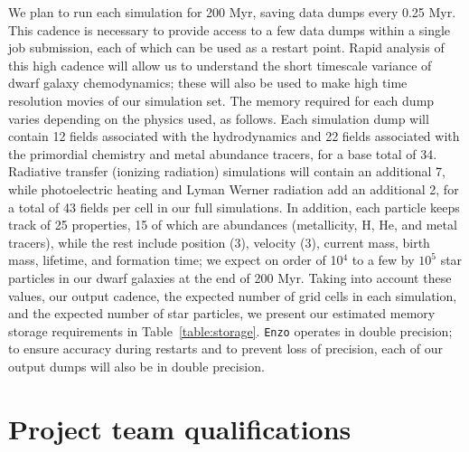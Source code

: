 \documentclass[11pt]{article}
\begin{document}
We plan to run each simulation for 200 Myr, saving data dumps every 0.25 Myr. This cadence is necessary to provide access to a few data dumps within a single job submission, each of which can be used as a restart point. Rapid analysis of this high cadence will allow us to understand the short timescale variance of dwarf galaxy chemodynamics; these will also be used to make high time resolution movies of our simulation set. The memory required for each dump varies depending on the physics used, as follows. Each simulation dump will contain 12 fields associated with the hydrodynamics and 22 fields associated with the primordial chemistry and metal abundance tracers, for a base total of 34. Radiative transfer (ionizing radiation) simulations will contain an additional 7, while photoelectric heating and Lyman Werner radiation add an additional 2, for a total of 43 fields per cell in our full simulations. In addition, each particle keeps track of 25 properties, 15 of which are abundances (metallicity, H, He, and metal tracers), while the rest include position (3), velocity (3), current mass, birth mass, lifetime, and formation time; we expect on order of 10$^{4}$ to a few by $10^{5}$ star particles in our dwarf galaxies at the end of 200 Myr. Taking into account these values, our output cadence, the expected number of grid cells in each simulation, and the expected number of star particles, we present our estimated memory storage requirements in Table~\ref{table:storage}. \texttt{Enzo} operates in double precision; to ensure accuracy during restarts and to prevent loss of precision, each of our output dumps will also be in double precision.

\section{Project team qualifications}
\end{document}
